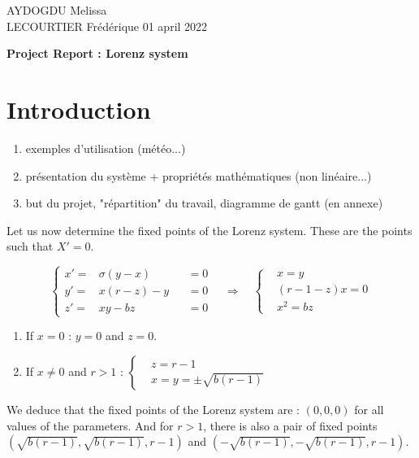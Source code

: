 \documentclass[12pt]{article}
\begin{document}
	\nocite{*}
	AYDOGDU Melissa \\
	LECOURTIER Frédérique \hfill 01 april 2022
	\begin{center}
		\Large\textbf{Project Report : Lorenz system}\\
	\end{center}
	
	\tableofcontents
	
	\section{Introduction}
	
	\begin{enumerate}[label=\textbullet]
		\item exemples d'utilisation (météo...)
		\item présentation du système + propriétés mathématiques (non linéaire...) 
		\item but du projet, "répartition" du travail, diagramme de gantt (en annexe)
	\end{enumerate}

	\noindent Let us now determine the fixed points of the Lorenz system. These are the points such that $X'=0$. 
	
	$$
	\left\{\begin{aligned}
		x'=&\sigma(y-x) &&=0 \\
		y'=&x(r-z)-y  &&=0\\
		z'=&xy-bz &&=0
	\end{aligned}\right. 
	\quad \Rightarrow \quad 
	\left\{\begin{aligned}
		&x=y \\
		&(r-1-z)x=0\\
		&x^2=bz
	\end{aligned}\right.
	$$
	
	\begin{enumerate}[label=\textbullet]
		\item If $x=0$ : \quad  $y=0$ and $z=0$.
		\item If $x\ne 0$ and $r>1$ : \quad $\left\{\begin{aligned}
			&z=r-1\\
			&x=y=\pm\sqrt{b(r-1)}
		\end{aligned}\right.
		$
	\end{enumerate}
	
	\noindent We deduce that the fixed points of the Lorenz system are : $(0,0,0)$ for all values of the parameters. And for $r>1$, there is also a pair of fixed points $(\sqrt{b(r-1)},\sqrt{b(r-1)},r-1)$ and $(-\sqrt{b(r-1)},-\sqrt{b(r-1)},r-1)$.
	
\end{document}
